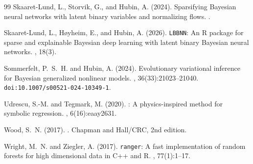 \documentclass[11pt,a4paper]{article}
\begin{document}
\begin{thebibliography}{99}
Skaaret-Lund, L., Storvik, G., and Hubin, A. (2024).
\newblock Sparsifying {B}ayesian neural networks with latent binary variables and normalizing flows.
.

Skaaret-Lund, L., H{\o}yheim, E., and Hubin, A. (2026).
\newblock \texttt{LBBNN}: An {R} package for sparse and explainable {B}ayesian deep learning with latent binary {B}ayesian neural networks.
, 18(3).

Sommerfelt, P.~S.~H. and Hubin, A. (2024).
\newblock Evolutionary variational inference for {B}ayesian generalized nonlinear models.
, 36(33):21023--21040.
\newblock \texttt{doi:10.1007/s00521-024-10349-1}.

Udrescu, S.-M. and Tegmark, M. (2020).
: A physics-inspired method for symbolic regression.
, 6(16):eaay2631.

Wood, S.~N. (2017).
.
\newblock Chapman and Hall/CRC, 2nd edition.

Wright, M.~N. and Ziegler, A. (2017).
\newblock \texttt{ranger}: A fast implementation of random forests for high dimensional data in {C++} and {R}.
, 77(1):1--17.

\end{thebibliography}
\end{document}
